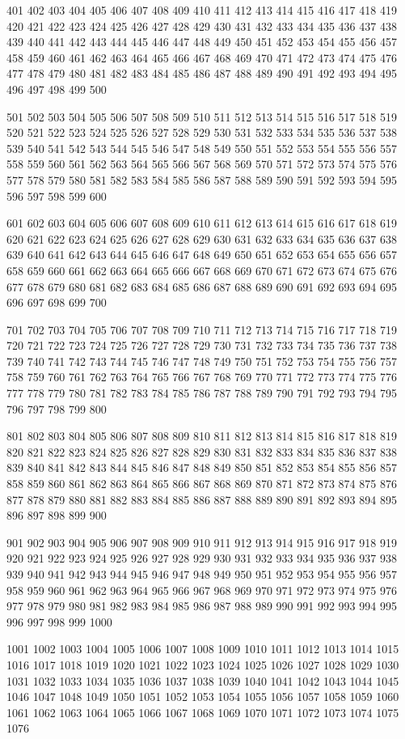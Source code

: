 401 402 403 404 405 406 407 408 409 410
411 412 413 414 415 416 417 418 419 420
421 422 423 424 425 426 427 428 429 430
431 432 433 434 435 436 437 438 439 440
441 442 443 444 445 446 447 448 449 450
451 452 453 454 455 456 457 458 459 460
461 462 463 464 465 466 467 468 469 470
471 472 473 474 475 476 477 478 479 480
481 482 483 484 485 486 487 488 489 490
491 492 493 494 495 496 497 498 499 500

501 502 503 504 505 506 507 508 509 510
511 512 513 514 515 516 517 518 519 520
521 522 523 524 525 526 527 528 529 530
531 532 533 534 535 536 537 538 539 540
541 542 543 544 545 546 547 548 549 550
551 552 553 554 555 556 557 558 559 560
561 562 563 564 565 566 567 568 569 570
571 572 573 574 575 576 577 578 579 580
581 582 583 584 585 586 587 588 589 590
591 592 593 594 595 596 597 598 599 600
\endmulticols

601 602 603 604 605 606 607 608 609 610
611 612 613 614 615 616 617 618 619 620
621 622 623 624 625 626 627 628 629 630
631 632 633 634 635 636 637 638 639 640
641 642 643 644 645 646 647 648 649 650
651 652 653 654 655 656 657 658 659 660
661 662 663 664 665 666 667 668 669 670
671 672 673 674 675 676 677 678 679 680
681 682 683 684 685 686 687 688 689 690
691 692 693 694 695 696 697 698 699 700

701 702 703 704 705 706 707 708 709 710
711 712 713 714 715 716 717 718 719 720
721 722 723 724 725 726 727 728 729 730
731 732 733 734 735 736 737 738 739 740
741 742 743 744 745 746 747 748 749 750
751 752 753 754 755 756 757 758 759 760
761 762 763 764 765 766 767 768 769 770
771 772 773 774 775 776 777 778 779 780
781 782 783 784 785 786 787 788 789 790
791 792 793 794 795 796 797 798 799 800

801 802 803 804 805 806 807 808 809 810
811 812 813 814 815 816 817 818 819 820
821 822 823 824 825 826 827 828 829 830
831 832 833 834 835 836 837 838 839 840
841 842 843 844 845 846 847 848 849 850
851 852 853 854 855 856 857 858 859 860
861 862 863 864 865 866 867 868 869 870
871 872 873 874 875 876 877 878 879 880
881 882 883 884 885 886 887 888 889 890
891 892 893 894 895 896 897 898 899 900

901 902 903 904 905 906 907 908 909 910
911 912 913 914 915 916 917 918 919 920
921 922 923 924 925 926 927 928 929 930
931 932 933 934 935 936 937 938 939 940
941 942 943 944 945 946 947 948 949 950
951 952 953 954 955 956 957 958 959 960
961 962 963 964 965 966 967 968 969 970
971 972 973 974 975 976 977 978 979 980
981 982 983 984 985 986 987 988 989 990
991 992 993 994 995 996 997 998 999 1000
\endmulticols

1001 1002 1003 1004 1005 1006 1007 1008 1009 1010
1011 1012 1013 1014 1015 1016 1017 1018 1019 1020
1021 1022 1023 1024 1025 1026 1027 1028 1029 1030
1031 1032 1033 1034 1035 1036 1037 1038 1039 1040
1041 1042 1043 1044 1045 1046 1047 1048 1049 1050
1051 1052 1053 1054 1055 1056 1057 1058 1059 1060
1061 1062 1063 1064 1065 1066 1067 1068 1069 1070
1071 1072 1073 1074 1075 1076 

\bye
